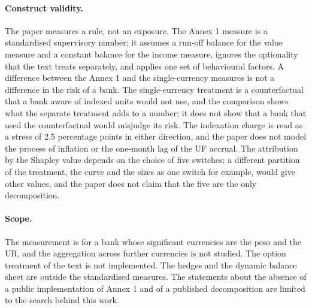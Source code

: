 \paragraph{Construct validity.}
The paper measures a rule, not an exposure. The Annex 1 measure is a standardised supervisory number; it assumes a run-off balance for the value measure and a constant balance for the income measure, ignores the optionality that the text treats separately, and applies one set of behavioural factors. A difference between the Annex 1 and the single-currency measures is not a difference in the risk of a bank. The single-currency treatment is a counterfactual that a bank aware of indexed units would not use, and the comparison shows what the separate treatment adds to a number; it does not show that a bank that used the counterfactual would misjudge its risk. The indexation charge is read as a stress of 2.5 percentage points in either direction, and the paper does not model the process of inflation or the one-month lag of the UF accrual. The attribution by the Shapley value depends on the choice of five switches; a different partition of the treatment, the curve and the sizes as one switch for example, would give other values, and the paper does not claim that the five are the only decomposition.

\paragraph{Scope.}
The measurement is for a bank whose significant currencies are the peso and the UR, and the aggregation across further currencies is not studied. The option treatment of the text is not implemented. The hedges and the dynamic balance sheet are outside the standardised measures. The statements about the absence of a public implementation of Annex 1 and of a published decomposition are limited to the search behind this work.
